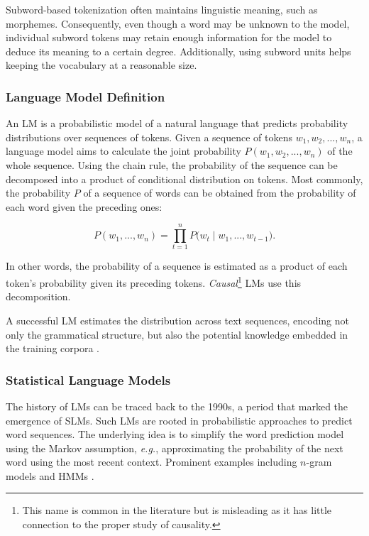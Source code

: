Subword-based tokenization often maintains linguistic meaning, such as morphemes. Consequently, even though a word may be unknown to the model, individual subword tokens may retain enough information for the model to deduce its meaning to a certain degree. Additionally, using subword units helps keeping the vocabulary at a reasonable size.


\subsubsection{Language Model Definition}

An \ac{LM} is a probabilistic model of a natural language that predicts probability distributions over sequences of tokens. Given a sequence of tokens $w_1, w_2, ..., w_n$, a language model aims to calculate the joint probability $P(w_1, w_2, ..., w_n)$ of the whole sequence. Using the chain rule, the probability of the sequence can be decomposed into a product of conditional distribution on tokens. Most commonly, the probability $P$ of a sequence of words can be obtained from the probability of each word given the preceding ones:

\begin{equation}
    P(w_1, ..., w_n) = \prod_{t=1}^{n} P\bigl(w_t \mid w_1, ..., w_{t-1}\bigr).
\label{equation:causal-distribution}
\end{equation}

In other words, the probability of a sequence is estimated as a product of each token's probability given its preceding tokens. \textit{Causal}\footnote{This name is common in the literature but is misleading as it has little connection to the proper study of causality.} \acp{LM} use this decomposition.

A successful \ac{LM} estimates the distribution across text sequences, encoding not only the grammatical structure, but also the potential knowledge embedded in the training corpora \citep{jozefowicz2016exploring}.

\subsubsection{Statistical Language Models} The history of \acp{LM} can be traced back to the 1990s, a period that marked the emergence of \acp{SLM}. Such \acp{LM} are rooted in probabilistic approaches to predict word sequences. The underlying idea is to simplify the word prediction model using the Markov assumption, \textit{e.g.}, approximating the probability of the next word using the most recent context. Prominent examples including $n$-gram models \citep{brown1992class, omar2018arabic} and \acp{HMM} \citep{petrushin2000hidden}.

